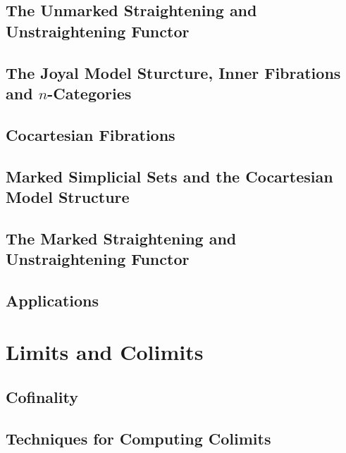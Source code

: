 \documentclass[12pt]{report}
\begin{document}


\subsection{The Unmarked Straightening and Unstraightening Functor}



\subsection{The Joyal Model Sturcture, Inner Fibrations and \texorpdfstring{$n$}{n}-Categories}



\subsection{Cocartesian Fibrations}



\subsection{Marked Simplicial Sets and the Cocartesian Model Structure}



\subsection{The Marked Straightening and Unstraightening Functor}



\subsection{Applications}



\section{Limits and Colimits}

\subsection{Cofinality}



\subsection{Techniques for Computing Colimits}
\end{document}
